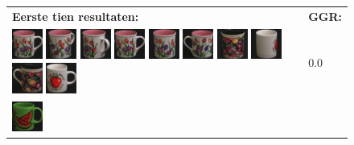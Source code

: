 \begin{figure}[tbp]
\begin{center}
\begin{tabular}{m{11cm} | m{3cm} |}
\textbf{Eerste tien resultaten:} & \textbf{GGR:} \\
\vspace{4pt}
\includegraphics[width=1cm]{coil/beeld-6.eps}
\includegraphics[width=1cm]{coil/beeld-9.eps}
\includegraphics[width=1cm]{coil/beeld-10.eps}
\includegraphics[width=1cm]{coil/beeld-6.eps}
\includegraphics[width=1cm]{coil/beeld-8.eps}
\includegraphics[width=1cm]{coil/beeld-7.eps}
\includegraphics[width=1cm]{coil/beeld-62.eps}
\includegraphics[width=1cm]{coil/beeld-38.eps}
\includegraphics[width=1cm]{coil/beeld-61.eps}
\includegraphics[width=1cm]{coil/beeld-36.eps}
& {\scriptsize 0.0}
\\
\includegraphics[width=1cm]{coil/beeld-30.eps}

\end{tabular}
\end{center}
\end{figure}
